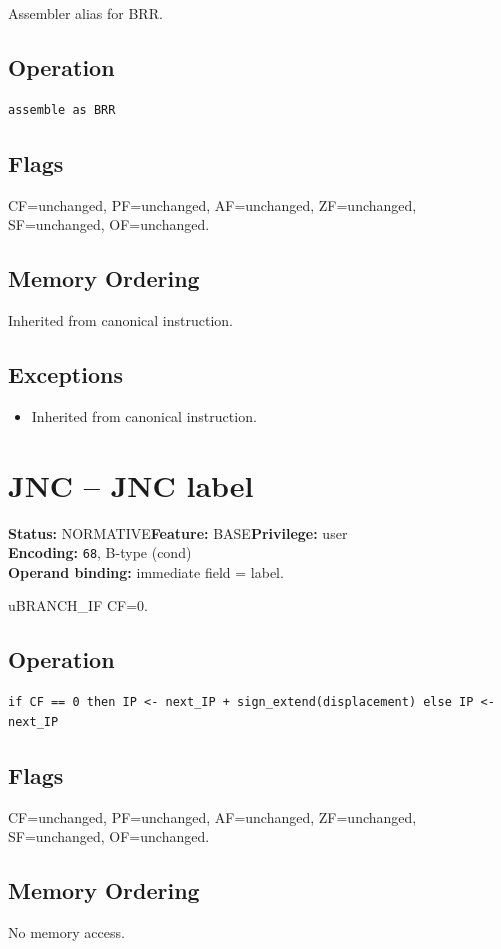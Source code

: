 \documentclass[10pt]{article}
\begin{document}
Assembler alias for BRR.

\subsection*{Operation}
\begin{lstlisting}
assemble as BRR
\end{lstlisting}
\subsection*{Flags}
CF=unchanged, PF=unchanged, AF=unchanged, ZF=unchanged, SF=unchanged, OF=unchanged.
\subsection*{Memory Ordering}
Inherited from canonical instruction.
\subsection*{Exceptions}
\begin{itemize}
\item Inherited from canonical instruction.
\end{itemize}
\clearpage

\section{JNC -- JNC label}
\textbf{Status:} NORMATIVE\quad \textbf{Feature:} BASE\quad \textbf{Privilege:} user\\
\textbf{Encoding:} \texttt{68}, B-type (cond)\\
\textbf{Operand binding:} immediate field = label.

uBRANCH\_IF CF=0.

\subsection*{Operation}
\begin{lstlisting}
if CF == 0 then IP <- next_IP + sign_extend(displacement) else IP <- next_IP
\end{lstlisting}
\subsection*{Flags}
CF=unchanged, PF=unchanged, AF=unchanged, ZF=unchanged, SF=unchanged, OF=unchanged.
\subsection*{Memory Ordering}
No memory access.
\end{document}

